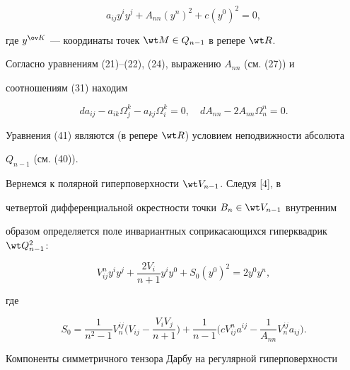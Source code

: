 \begin{equation} 


a_{ij}y^i y^j+A_{nn}(y^n)^2+c(y^0)^2=0, 


\end{equation} 


где $y^{\ov K}$ --- координаты точек $\wt M\in Q_{n-1}$ в репере $\wt R$. 


 


Согласно уравнениям (21)--(22), (24), выражению $A_{nn}$ (см. (27)) и 


соотношениям (31) находим 


\begin{equation} 


da_{ij}-a_{ik}\Omega^k_j-a_{kj}\Omega^k_i=0,\quad 


dA_{nn}-2A_{nn}\Omega^n_n=0. 


\end{equation} 


Уравнения (41) являются (в репере $\wt R$) условием неподвижности абсолюта 


$Q_{n-1}$ (см. (40)). 


 


Вернемся к полярной гиперповерхности $\wt V_{n-1}$. Следуя [4], в 


четвертой дифференциальной окрестности точки $B_n\in\wt V_{n-1}$ внутренним 


образом определяется поле инвариантных соприкасающихся гиперквадрик $\wt 


Q^2_{n-1}$: 


\begin{equation} 


V^n_{ij}y^i y^j+\frac{2V_i}{n+1}y^i y^0+S_0(y^0)^2=2y^0y^n, 


\end{equation} 


где 


$$ 


S_0=\frac{1}{n^2-1}V^{ij}_n\bigg(V_{ij}-\frac{V_i V_j}{n+1} \bigg)+ 


\frac{1}{n-1}\bigg(c V^n_{ij}a^{ij}-\frac{1}{A_{nn}}V^{ij}_n a_{ij} 


\bigg). 


$$ 


 


Компоненты симметричного тензора Дарбу на регулярной гиперповерхности 


